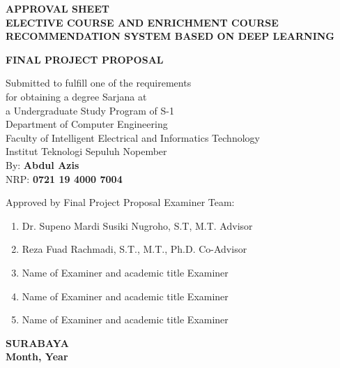 {
\begin{center}
    \uppercase{\textbf{\large Approval Sheet}} \\

    \vspace*{15mm}
    \uppercase{\textbf{Elective Course and Enrichment course recommendation system based on Deep Learning}}
    \vspace*{15mm}

    \uppercase{\textbf{Final Project Proposal}}

    \vspace*{3mm}
    Submitted to fulfill one of the requirements                  \\
    \vspace*{3mm}
    for obtaining a degree Sarjana at                             \\
    \vspace*{3mm}a
    Undergraduate Study Program of S-1                            \\
    \vspace*{3mm}
    Department of Computer Engineering                            \\
    \vspace*{3mm}
    Faculty of Intelligent Electrical and Informatics Technology  \\
    \vspace*{3mm}
    Institut Teknologi Sepuluh Nopember                           \\

    \vspace*{1.5cm}
    By: \textbf{Abdul Azis}                                       \\
    \vspace*{3mm}
    NRP: \textbf{0721 19 4000 7004}                               \\
    \vspace*{1.5cm}

    Approved by Final Project Proposal Examiner Team:             \\
    \vspace*{5mm}

    \begin{enumerate}
        \setlength\itemsep{1.5em}
        \item Dr. Supeno Mardi Susiki Nugroho, S.T, M.T. \hfill Advisor
        \item Reza Fuad Rachmadi, S.T., M.T., Ph.D. \hfill Co-Advisor
        \item Name of Examiner and academic title \hfill Examiner
        \item Name of Examiner and academic title \hfill Examiner
        \item Name of Examiner and academic title \hfill Examiner
    \end{enumerate}

    \vspace*{1.5cm}
    \uppercase{\textbf{surabaya}}                      \\
    \textbf{Month, Year}                               \\

\end{center}
}